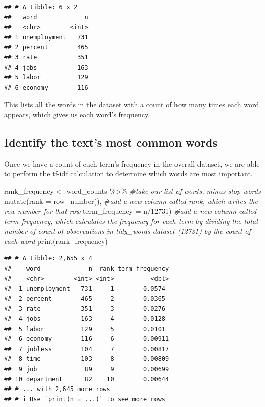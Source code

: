 \documentclass[
  krantz2]{krantz}
\makeatletter
\newenvironment{Shaded}{\begin{snugshade}}{\end{snugshade}}
\newcommand{\AttributeTok}[1]{\textcolor[rgb]{0.61,0.61,0.61}{#1}}
\newcommand{\CommentTok}[1]{\textcolor[rgb]{0.37,0.37,0.37}{\textit{#1}}}
\newcommand{\DecValTok}[1]{\textcolor[rgb]{0.06,0.06,0.06}{#1}}
\newcommand{\FunctionTok}[1]{\textcolor[rgb]{0,0,0}{#1}}
\newcommand{\NormalTok}[1]{#1}
\newcommand{\OtherTok}[1]{\textcolor[rgb]{0.37,0.37,0.37}{#1}}
\newcommand{\SpecialCharTok}[1]{\textcolor[rgb]{0,0,0}{#1}}
\newenvironment{kframe}{%
\medskip{}
\setlength{\fboxsep}{.8em}
 \def\at@end@of@kframe{}%
 \ifinner\ifhmode%
  \def\at@end@of@kframe{\end{minipage}}%
  \begin{minipage}{\columnwidth}%
 \fi\fi%
 \def\FrameCommand##1{\hskip\@totalleftmargin \hskip-\fboxsep
 \colorbox{shadecolor}{##1}\hskip-\fboxsep
     \hskip-\linewidth \hskip-\@totalleftmargin \hskip\columnwidth}%
 \MakeFramed {\advance\hsize-\width
   \@totalleftmargin\z@ \linewidth\hsize
   \@setminipage}}%
 {\par\unskip\endMakeFramed%
 \at@end@of@kframe}
\renewenvironment{Shaded}{\begin{kframe}}{\end{kframe}}
\makeatother
\begin{document}
\begin{verbatim}
## # A tibble: 6 x 2
##   word             n
##   <chr>        <int>
## 1 unemployment   731
## 2 percent        465
## 3 rate           351
## 4 jobs           163
## 5 labor          129
## 6 economy        116
\end{verbatim}

This lists all the words in the dataset with a count of how many times each word appears, which gives us each word's frequency.

\hypertarget{term-frequency}{%
\subsection{Identify the text's most common words}\label{term-frequency}}

Once we have a count of each term's frequency in the overall dataset, we are able to perform the tf-idf calculation to determine which words are most important.

\begin{Shaded}
\begin{Highlighting}[]
\NormalTok{rank\_frequency }\OtherTok{\textless{}{-}}\NormalTok{ word\_counts }\SpecialCharTok{\%\textgreater{}\%}  \CommentTok{\#take our list of words, minus stop words}
  \FunctionTok{mutate}\NormalTok{(}\AttributeTok{rank =} \FunctionTok{row\_number}\NormalTok{(),  }\CommentTok{\#add a new column called rank, which writes the row number for that row}
         \AttributeTok{term\_frequency =}\NormalTok{ n}\SpecialCharTok{/}\DecValTok{12731}\NormalTok{)  }\CommentTok{\#add a new column called term frequency, which calculates the frequency for each term by dividing the total number of count of observations in tidy\_words dataset (12731) by the count of each word}
\FunctionTok{print}\NormalTok{(rank\_frequency)}
\end{Highlighting}
\end{Shaded}

\begin{verbatim}
## # A tibble: 2,655 x 4
##    word             n  rank term_frequency
##    <chr>        <int> <int>          <dbl>
##  1 unemployment   731     1        0.0574
##  2 percent        465     2        0.0365
##  3 rate           351     3        0.0276
##  4 jobs           163     4        0.0128
##  5 labor          129     5        0.0101
##  6 economy        116     6        0.00911
##  7 jobless        104     7        0.00817
##  8 time           103     8        0.00809
##  9 job             89     9        0.00699
## 10 department      82    10        0.00644
## # ... with 2,645 more rows
## # i Use `print(n = ...)` to see more rows
\end{verbatim}
\end{document}
